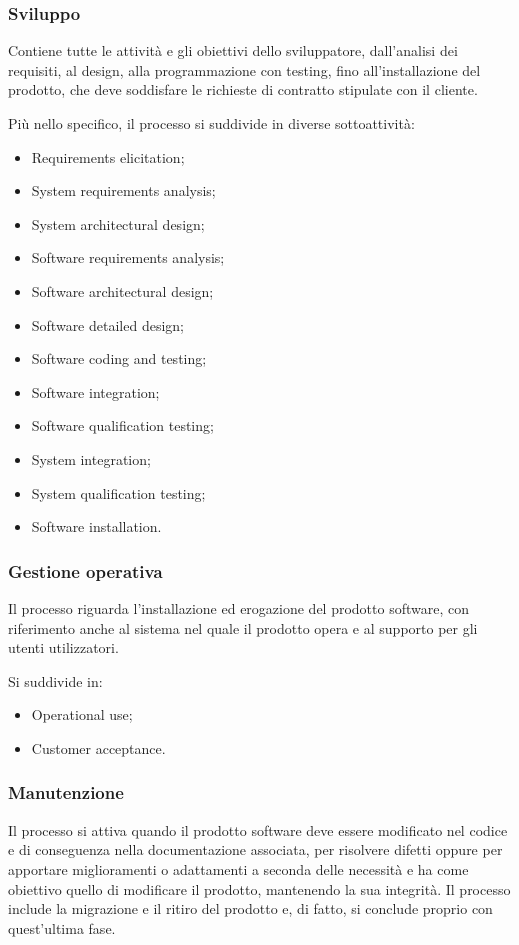 \subsubsection{Sviluppo}
Contiene tutte le attività e gli obiettivi dello sviluppatore, dall'analisi dei requisiti, al design, alla programmazione con testing, fino all'installazione del prodotto, che deve soddisfare le richieste di contratto stipulate con il cliente.
\par Più nello specifico, il processo si suddivide in diverse sottoattività:
\begin{itemize}
    \item Requirements elicitation;
    \item System requirements analysis;
    \item System architectural design;
    \item Software requirements analysis;
    \item Software architectural design;
    \item Software detailed design;
    \item Software coding and testing;
    \item Software integration;
    \item Software qualification testing;
    \item System integration;
    \item System qualification testing;
    \item Software installation.
\end{itemize}
\subsubsection{Gestione operativa}
Il processo riguarda l'installazione ed erogazione del prodotto software, con riferimento anche al sistema nel quale il prodotto opera e al supporto per gli utenti utilizzatori.
\par Si suddivide in:
\begin{itemize}
    \item Operational use;
    \item Customer acceptance.
\end{itemize}
\subsubsection{Manutenzione}
Il processo si attiva quando il prodotto software deve essere modificato nel codice e di conseguenza nella documentazione associata, per risolvere difetti oppure per apportare miglioramenti o adattamenti a seconda delle necessità e ha come obiettivo quello di modificare il prodotto, mantenendo la sua integrità. Il processo include la migrazione e il ritiro del prodotto e, di fatto, si conclude proprio con quest'ultima fase.

